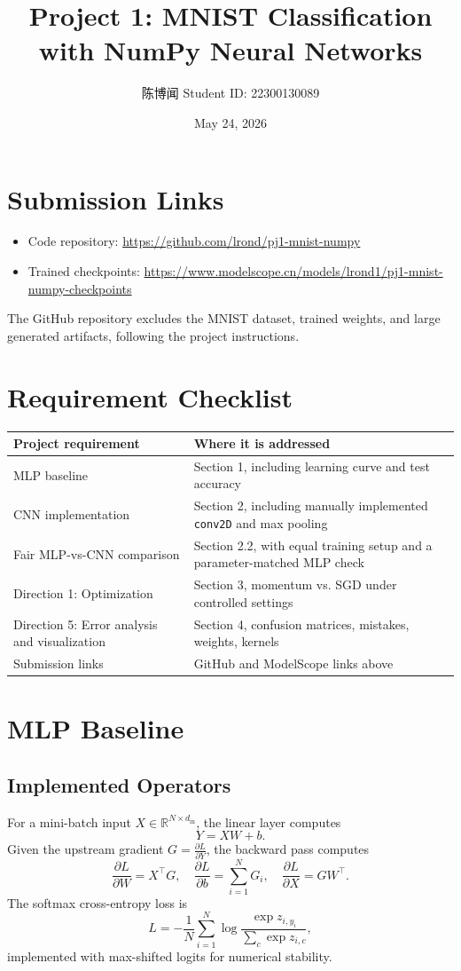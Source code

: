 \documentclass[11pt]{ctexart}
\title{Project 1: MNIST Classification with NumPy Neural Networks}
\author{陈博闻 \quad Student ID: 22300130089}
\date{May 24, 2026}
\newcommand{\githuburl}{https://github.com/lrond/pj1-mnist-numpy}
\newcommand{\checkpointurl}{https://www.modelscope.cn/models/lrond1/pj1-mnist-numpy-checkpoints}
\begin{document}
\maketitle

\section*{Submission Links}
\begin{itemize}
  \item Code repository: \url{\githuburl}
  \item Trained checkpoints: \url{\checkpointurl}
\end{itemize}
The GitHub repository excludes the MNIST dataset, trained weights, and large generated artifacts, following the project instructions.

\section*{Requirement Checklist}
\begin{table}[H]
\centering
\small
\begin{tabularx}{\linewidth}{l>{\raggedright\arraybackslash}X}
\toprule
Project requirement & Where it is addressed \\
\midrule
MLP baseline & Section 1, including learning curve and test accuracy \\
CNN implementation & Section 2, including manually implemented \texttt{conv2D} and max pooling \\
Fair MLP-vs-CNN comparison & Section 2.2, with equal training setup and a parameter-matched MLP check \\
Direction 1: Optimization & Section 3, momentum vs. SGD under controlled settings \\
Direction 5: Error analysis and visualization & Section 4, confusion matrices, mistakes, weights, kernels \\
Submission links & GitHub and ModelScope links above \\
\bottomrule
\end{tabularx}
\end{table}

\section{MLP Baseline}

\subsection{Implemented Operators}
For a mini-batch input $X \in \mathbb{R}^{N \times d_{\text{in}}}$, the linear layer computes
\[
Y = XW + b.
\]
Given the upstream gradient $G = \frac{\partial L}{\partial Y}$, the backward pass computes
\[
\frac{\partial L}{\partial W}=X^\top G,\quad
\frac{\partial L}{\partial b}=\sum_{i=1}^{N} G_i,\quad
\frac{\partial L}{\partial X}=GW^\top.
\]
The softmax cross-entropy loss is
\[
L=-\frac{1}{N}\sum_{i=1}^{N}\log
\frac{\exp z_{i,y_i}}{\sum_c \exp z_{i,c}},
\]
implemented with max-shifted logits for numerical stability.
\end{document}
